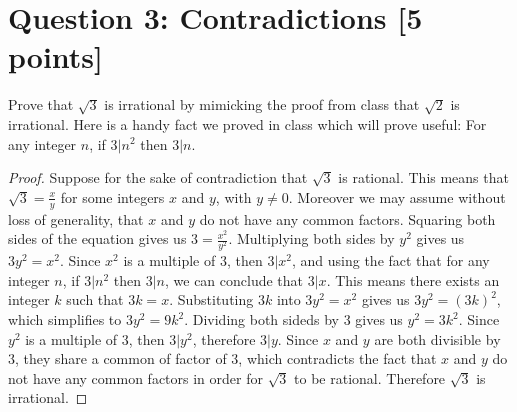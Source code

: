 \documentclass{report}
\theoremstyle{mytheoremstyle}
\theoremstyle{mytheoremstyle}
\theoremstyle{myproblemstyle}
\begin{document}
\section*{\Large{Question 3: Contradictions [5 points]}}
Prove that $\sqrt{3}$ is irrational by mimicking the proof from class that $\sqrt{2}$ is irrational. Here is a handy fact we proved in class which will prove useful: For any integer $n$, if $3|n^2$ then $3|n$.
\begin{proof}
    Suppose for the sake of contradiction that $\sqrt{3}$ is rational. This means that $\sqrt{3}=\frac{x}{y}$ for some integers $x$ and $y$, with $y\neq 0$. Moreover we may assume without loss of generality, that $x$ and $y$ do not have any common factors. Squaring both sides of the equation gives us $3=\frac{x^2}{y^2}$. Multiplying both sides by $y^2$ gives us $3y^2=x^2$. Since $x^2$ is a multiple of $3$, then $3|x^2$, and using the fact that for any integer $n$, if $3|n^2$ then $3|n$, we can conclude that $3|x$. This means there exists an integer $k$ such that $3k=x$. Substituting $3k$ into $3y^2=x^2$ gives us $3y^2=(3k)^2$, which simplifies to $3y^2=9k^2$. Dividing both sideds by $3$ gives us $y^2=3k^2$. Since $y^2$ is a multiple of $3$, then $3|y^2$, therefore $3|y$. Since $x$ and $y$ are both divisible by $3$, they share a common of factor of $3$, which contradicts the fact that $x$ and $y$ do not have any common factors in order for $\sqrt{3}$ to be rational. Therefore $\sqrt{3}$ is irrational.
\end{proof}
\newpage
\end{document}
